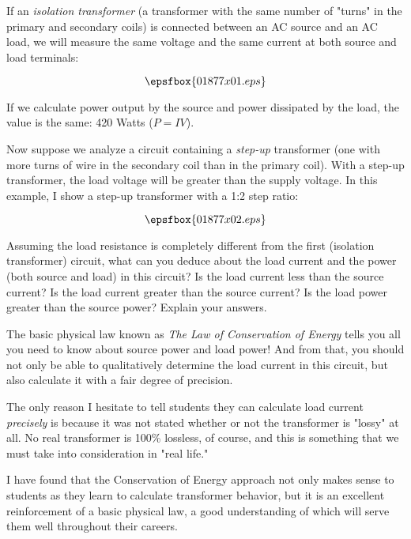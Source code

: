 

If an {\it isolation transformer} (a transformer with the same number of "turns" in the primary and secondary coils) is connected between an AC source and an AC load, we will measure the same voltage and the same current at both source and load terminals:

$$\epsfbox{01877x01.eps}$$

If we calculate power output by the source and power dissipated by the load, the value is the same: 420 Watts ($P = IV$).

\vskip 10pt

Now suppose we analyze a circuit containing a {\it step-up} transformer (one with more turns of wire in the secondary coil than in the primary coil).  With a step-up transformer, the load voltage will be greater than the supply voltage.  In this example, I show a step-up transformer with a 1:2 step ratio:

$$\epsfbox{01877x02.eps}$$

Assuming the load resistance is completely different from the first (isolation transformer) circuit, what can you deduce about the load current and the power (both source and load) in this circuit?  Is the load current less than the source current?  Is the load current greater than the source current?  Is the load power greater than the source power?  Explain your answers.







The basic physical law known as {\it The Law of Conservation of Energy} tells you all you need to know about source power and load power!  And from that, you should not only be able to qualitatively determine the load current in this circuit, but also calculate it with a fair degree of precision.







The only reason I hesitate to tell students they can calculate load current {\it precisely} is because it was not stated whether or not the transformer is "lossy" at all.  No real transformer is 100\% lossless, of course, and this is something that we must take into consideration in "real life."

I have found that the Conservation of Energy approach not only makes sense to students as they learn to calculate transformer behavior, but it is an excellent reinforcement of a basic physical law, a good understanding of which will serve them well throughout their careers.




